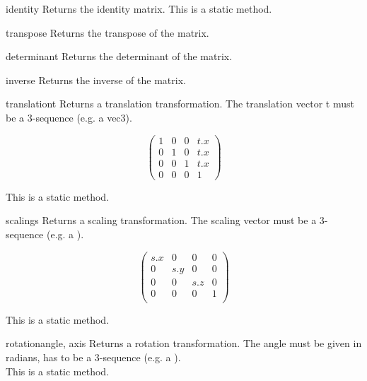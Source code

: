 \begin{methoddesc}{identity}{}
Returns the identity matrix. This is a static method. 
\end{methoddesc}

\begin{methoddesc}{transpose}{}
Returns the transpose of the matrix.
\end{methoddesc}

\begin{methoddesc}{determinant}{}
Returns the determinant of the matrix.
\end{methoddesc}

\begin{methoddesc}{inverse}{}
Returns the inverse of the matrix.
\end{methoddesc}

\begin{methoddesc}{translation}{t}
Returns a translation transformation. The translation vector t must be a
3-sequence (e.g. a vec3).

\[ \left( \begin{array}{cccc}
1 & 0 & 0 & t.x \\
0 & 1 & 0 & t.x \\
0 & 0 & 1 & t.x \\
0 & 0 & 0 & 1 
\end{array} \right) \]

This is a static method. 
\end{methoddesc}

\begin{methoddesc}{scaling}{s}
Returns a scaling transformation. The scaling vector  must be a
3-sequence (e.g. a ).

\[ \left( \begin{array}{cccc}
s.x & 0 & 0 & 0\\
0 & s.y & 0 & 0\\
0 & 0 & s.z & 0\\
0 & 0 & 0 & 1\\
\end{array} \right) \]

This is a static method. 
\end{methoddesc}

\begin{methoddesc}{rotation}{angle, axis}
Returns a rotation transformation. The angle must be given in radians,
 has to be a 3-sequence (e.g. a ).\\
This is a static method. 
\end{methoddesc}

